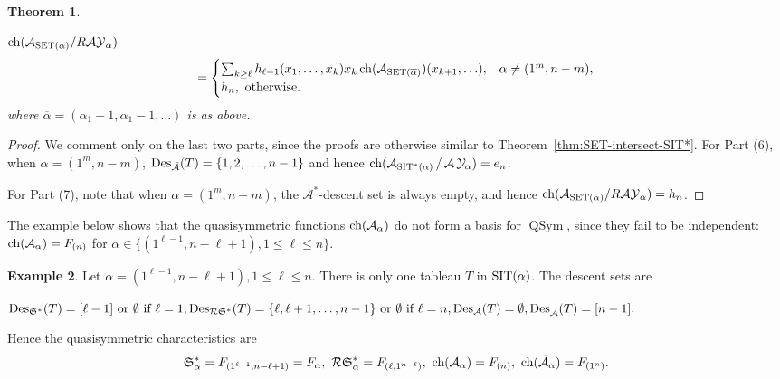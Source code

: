 \documentclass[12pt,letterpaper]{amsart}
\newtheorem{theorem}{Theorem}[section]
\theoremstyle{definition}
\newtheorem{example}[theorem]{Example}
\newcommand{\dI}{\mathfrak{S}^*}
\newcommand{\rdI}{\mathcal{R}\mathfrak{S}^*}
\DeclareMathOperator{\Des}{Des}
\newcommand{\Qsym}{\ensuremath{\operatorname{QSym}}}
\newcommand{\SET}{\ensuremath{\operatorname{SET}}} \newcommand{\NSET}{\ensuremath{\operatorname{NSET}}}\newcommand{\SRCT}{\ensuremath{\operatorname{SRCT}}}
\begin{document}
\begin{theorem}
\begin{enumerate}
$\chr(\mathcal{A}_{\SET(\alpha)}/R{\mathcal{AY}}_\alpha)$
\begin{equation}\label{eqn:Elizabeth2022Feb21-A}
=
\begin{cases}
\sum_{k\geq \ell} h_{\ell -1} (x_1, \ldots, x_{k})x_k\chr(\mathcal{A}_{\SET(\overline{\alpha})})(x_{k+1},\ldots), & \alpha \neq (1^m,n-m),\\
h_n, \text{ otherwise}.
\end{cases}
\end{equation}
where $\overline{\alpha}=(\alpha_1-1, \alpha_1-1,\ldots)$ is as above. 
\end{enumerate}
\end{theorem}

\begin{proof} We comment only on the last two parts, since the proofs are otherwise similar to Theorem~\ref{thm:SET-intersect-SIT*}.
For Part (6), when $\alpha = (1^m,n-m)$,  $\Des_{\bA}(T) = \{1,2,\ldots, n-1\}$ and hence 
$\operatorname{\mathrm{ch}}(\operatorname{\bar{\mathcal{A}}}_{\operatorname{SIT}^*(\alpha)}/\operatorname{\bar{\mathcal{A}}}\mathcal{Y}_\alpha)=e_n$.

For Part (7), note that when $\alpha = (1^m,n-m)$, the $\mathcal{A}^*$-descent set is always empty, and hence 
$\chr(\mathcal{A}_{\SET(\alpha)}/R{\mathcal{AY}}_\alpha)=h_n$.
\end{proof}

The example below shows that the quasisymmetric functions $\operatorname{\mathrm{ch}}(\mathcal{A}_\alpha)$ do not form a basis for $\Qsym$, since they fail to be independent:
$\operatorname{\mathrm{ch}}(\mathcal{A}_\alpha)=F_{(n)}$ for $\alpha\in\{ (1^{\ell-1},n-\ell+1), 1\le \ell\le n\}$.
\begin{example}\label{ex:new-quasisym} 
Let $\alpha=(1^{\ell-1},n-\ell+1), 1\le \ell\le n.$ There  is only one tableau $T$ in $\operatorname{SIT}(\alpha)$.  
The descent sets are

$\Des_{\dI}(T)=[\ell-1] \text{ or }\emptyset \text{ if } \ell=1, \Des_{\rdI}(T)=\{\ell, \ell+1,\ldots,n-1\} \text{ or }\emptyset \text{ if } \ell=n, \Des_{\mathcal{A}}(T)=\emptyset, \Des_{\bA}(T)=[n-1].$

Hence the quasisymmetric characteristics are 
\[\dI_\alpha=F_{(1^{\ell-1}, n-\ell+1)}=F_\alpha,\  \rdI_\alpha=F_{(\ell, 1^{n-\ell})},  \ 
\chr(\mathcal{A}_\alpha)=F_{(n)},\ \chr({\bA}_\alpha)=F_{(1^n)}.\]
\end{example}
\end{document}
